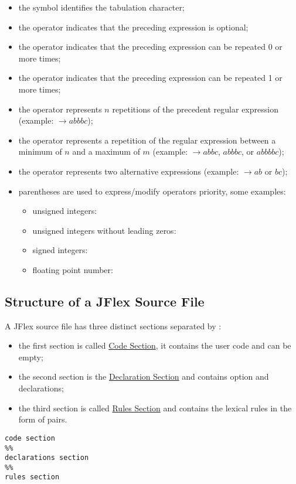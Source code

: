 \begin{itemize}
    \item the symbol \code{\\t} identifies the tabulation character;
    \item the operator  indicates that the preceding expression is optional;
    \item the operator \code{*} indicates that the preceding expression can be repeated 0 or more times;
    \item the operator \code{+} indicates that the preceding expression can be repeated 1 or more times;
    \item the operator  represents $n$ repetitions of the precedent regular expression (example:  $\to abbbc$);
    \item the operator  represents a repetition of the regular expression between a minimum of $n$ and a maximum of $m$ (example:  $\to abbc$, $abbbc$, or $abbbbc$);
    \item the operator \code{\|} represents two alternative expressions (example:  $\to ab$ or $bc$);
    \item parentheses are used to express/modify operators priority, some examples:
    \begin{itemize}
        \item unsigned integers: \code{[0-9]+}
        \item unsigned integers without leading zeros: \code{[1-9][0-9]*}
        \item signed integers: 
        \item floating point number: 
    \end{itemize}
\end{itemize}

\subsection{Structure of a JFlex Source File}
A JFlex source file has three distinct sections separated by \code{\%\%}:
\begin{itemize}
    \item the first section is called \underline{Code Section}, it contains the user code and can be empty;
    \item the second section is the \underline{Declaration Section} and contains option and declarations;
    \item the third section is called \underline{Rules Section} and contains the lexical rules in the form of  pairs.
\end{itemize}
\begin{lstlisting}[frame=single]
code section
%%
declarations section
%%
rules section
\end{lstlisting}

